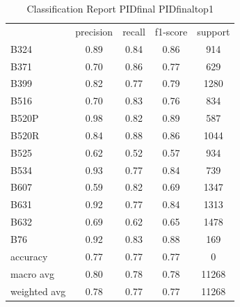 \begin{table}[htbp]
\centering
\caption{Classification Report PIDfinal PIDfinaltop1}
\label{tab:classificationreport.PIDfinal.PIDfinaltop1}
\begin{tabular}{lcccc}
 & precision & recall & f1-score & support \\
B324 & 0.89 & 0.84 & 0.86 & 914 \\
B371 & 0.70 & 0.86 & 0.77 & 629 \\
B399 & 0.82 & 0.77 & 0.79 & 1280 \\
B516 & 0.70 & 0.83 & 0.76 & 834 \\
B520P & 0.98 & 0.82 & 0.89 & 587 \\
B520R & 0.84 & 0.88 & 0.86 & 1044 \\
B525 & 0.62 & 0.52 & 0.57 & 934 \\
B534 & 0.93 & 0.77 & 0.84 & 739 \\
B607 & 0.59 & 0.82 & 0.69 & 1347 \\
B631 & 0.92 & 0.77 & 0.84 & 1313 \\
B632 & 0.69 & 0.62 & 0.65 & 1478 \\
B76 & 0.92 & 0.83 & 0.88 & 169 \\
accuracy & 0.77 & 0.77 & 0.77 & 0 \\
macro avg & 0.80 & 0.78 & 0.78 & 11268 \\
weighted avg & 0.78 & 0.77 & 0.77 & 11268 \\
\end{tabular}
\end{table}
